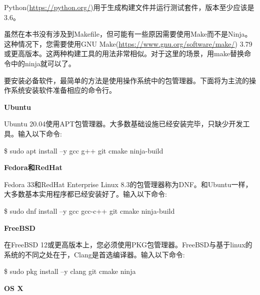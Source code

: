 Python(\url{https://python.org/})用于生成构建文件并运行测试套件，版本至少应该是3.6。\par

虽然在本书没有涉及到Makefile，但可能有一些原因需要使用Make而不是Ninja。这种情况下，您需要使用GNU Make(\url{https://www.gnu.org/software/make/}) 3.79或更高版本。这两种构建工具的用法非常相似。对于这里的场景，用make替换命令中的ninja就可以了。\par

要安装必备软件，最简单的方法是使用操作系统中的包管理器。下面将为主流的操作系统安装软件准备相应的命令行。\par

\hspace*{\fill} \par %
\textbf{Ubuntu}

Ubuntu 20.04使用APT包管理器。大多数基础设施已经安装完毕，只缺少开发工具。输入以下命令:\par

\begin{tcolorbox}[colback=white,colframe=black]
\$ sudo apt install –y gcc g++ git cmake ninja-build
\end{tcolorbox}

\hspace*{\fill} \par %
\textbf{Fedora和RedHat}

Fedora 33和RedHat Enterprise Linux 8.3的包管理器称为DNF。和Ubuntu一样，大多数基本实用程序都已经安装好了。输入以下命令:\par

\begin{tcolorbox}[colback=white,colframe=black]
\$ sudo dnf install –y gcc gcc-c++ git cmake ninja-build
\end{tcolorbox}

\hspace*{\fill} \par %
\textbf{FreeBSD}

在FreeBSD 12或更高版本上，您必须使用PKG包管理器。FreeBSD与基于linux的系统的不同之处在于，Clang是首选编译器。输入以下命令:\par

\begin{tcolorbox}[colback=white,colframe=black]
\$ sudo pkg install –y clang git cmake ninja
\end{tcolorbox}

\hspace*{\fill} \par %
\textbf{OS X}

